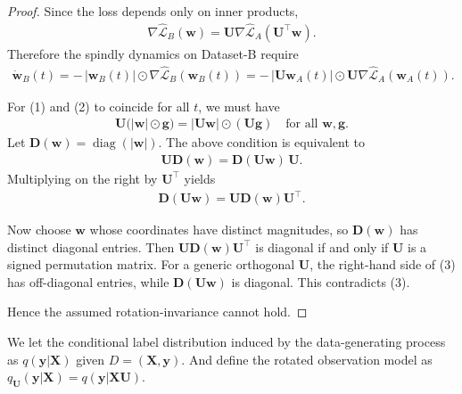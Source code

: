 \documentclass{article}
\theoremstyle{plain}
\theoremstyle{definition}
\theoremstyle{remark}
\begin{document}
{\begin{proof}
Since the loss depends only on inner products,
\begin{align}
\nabla \widehat{\mathcal L}_B(\mathbf w)
=
\mathbf U 
\nabla \widehat{\mathcal L}_A(\mathbf U^\top \mathbf w).
\end{align}
Therefore the spindly dynamics on Dataset-B require
\begin{align}
\dot{\mathbf w}_B(t)
=
-\,|\mathbf w_B(t)| \odot 
\nabla \widehat{\mathcal L}_B(\mathbf w_B(t))
=
-\,|\mathbf U \mathbf w_A(t)| \odot 
\mathbf U \nabla \widehat{\mathcal L}_A(\mathbf w_A(t)).
\tag{2}
\end{align}

For (1) and (2) to coincide for all $t$, we must have
\begin{align}
\mathbf U
\big(
|\mathbf w| \odot \mathbf g
\big)
=
|\mathbf U \mathbf w| \odot 
(\mathbf U \mathbf g)
\quad
\text{for all } \mathbf w, \mathbf g.
\end{align}
Let $\mathbf D(\mathbf w)=\operatorname{diag}(|\mathbf w|)$. 
The above condition is equivalent to
\begin{align}
\mathbf U \mathbf D(\mathbf w)
=
\mathbf D(\mathbf U \mathbf w)\, \mathbf U.
\end{align}
Multiplying on the right by $\mathbf U^\top$ yields
\begin{align}
\mathbf D(\mathbf U \mathbf w)
=
\mathbf U \mathbf D(\mathbf w) \mathbf U^\top.
\tag{3}
\end{align}

Now choose $\mathbf w$ whose coordinates have distinct magnitudes, so 
$\mathbf D(\mathbf w)$ has distinct diagonal entries. 
Then $\mathbf U \mathbf D(\mathbf w) \mathbf U^\top$ is diagonal 
if and only if $\mathbf U$ is a signed permutation matrix. 
For a generic orthogonal $\mathbf U$, the right-hand side of (3) has 
off-diagonal entries, while $\mathbf D(\mathbf U \mathbf w)$ is diagonal. 
This contradicts (3).

Hence the assumed rotation-invariance cannot hold.
\end{proof}

We let the conditional label distribution induced by the data-generating process as $q(\mathbf{y}|\mathbf{X})$ given $D=(\mathbf{X},\mathbf{y})$. And define the rotated observation model as $q_{\mathbf{U}}(\mathbf{y}|\mathbf{X})=q(\mathbf{y}|\mathbf{X}\mathbf{U})$.



}
\end{document}
